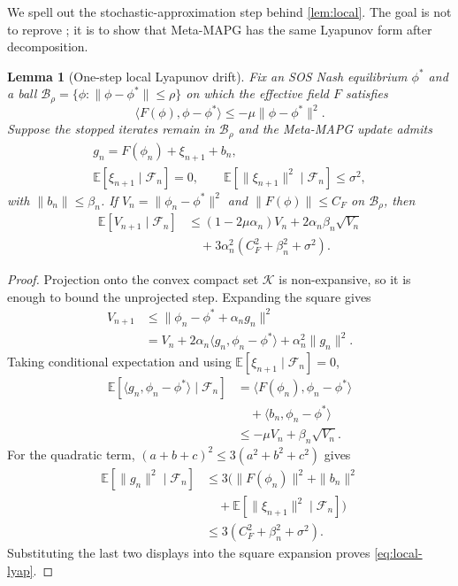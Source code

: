 \documentclass{article}
\theoremstyle{plain}
\newtheorem{lemma}[theorem]{Lemma}
\theoremstyle{definition}
\theoremstyle{remark}
\newcommand{\E}{\mathbb{E}}
\newcommand{\K}{\mathcal{K}}
\newcommand{\B}{\mathcal{B}}
\newcommand{\F}{\mathcal{F}}
\begin{document}
We spell out the stochastic-approximation step behind \cref{lem:local}. The goal is not to reprove \citet{giannou2022convergence}; it is to show that Meta-MAPG has the same Lyapunov form after decomposition.

\begin{lemma}[One-step local Lyapunov drift]\label{lem:app-lyapunov}
Fix an SOS Nash equilibrium $\phi^\ast$ and a ball $\B_\rho=\{\phi:\|\phi-\phi^\ast\|\le\rho\}$ on which the effective field $F$ satisfies
\[
\langle F(\phi),\phi-\phi^\ast\rangle\le -\mu\|\phi-\phi^\ast\|^2 .
\]
Suppose the stopped iterates remain in $\B_\rho$ and the Meta-MAPG update admits
\[
\begin{gathered}
g_n=F(\phi_n)+\xi_{n+1}+b_n,\\
\E[\xi_{n+1}\mid\F_n]=0,\qquad
\E[\|\xi_{n+1}\|^2\mid\F_n]\le\sigma^2,
\end{gathered}
\]
with $\|b_n\|\le\beta_n$. If $V_n=\|\phi_n-\phi^\ast\|^2$ and $\|F(\phi)\|\le C_F$ on $\B_\rho$, then
\begin{equation}\label{eq:local-lyap}
\begin{aligned}
\E[V_{n+1}\mid\F_n]
&\le (1-2\mu\alpha_n)V_n
   +2\alpha_n\beta_n\sqrt{V_n}\\
&\quad+3\alpha_n^2(C_F^2+\beta_n^2+\sigma^2).
\end{aligned}
\end{equation}
\end{lemma}

\begin{proof}
Projection onto the convex compact set $\K$ is non-expansive, so it is enough to bound the unprojected step. Expanding the square gives
\[
\begin{aligned}
V_{n+1}
&\le \|\phi_n-\phi^\ast+\alpha_n g_n\|^2\\
&=V_n+2\alpha_n\langle g_n,\phi_n-\phi^\ast\rangle
  +\alpha_n^2\|g_n\|^2 .
\end{aligned}
\]
Taking conditional expectation and using $\E[\xi_{n+1}\mid\F_n]=0$,
\[
\begin{aligned}
\E[\langle g_n,\phi_n-\phi^\ast\rangle\mid\F_n]
&=\langle F(\phi_n),\phi_n-\phi^\ast\rangle\\
&\quad+\langle b_n,\phi_n-\phi^\ast\rangle\\
&\le -\mu V_n+\beta_n\sqrt{V_n}.
\end{aligned}
\]
For the quadratic term, $(a+b+c)^2\le 3(a^2+b^2+c^2)$ gives
\[
\begin{aligned}
\E[\|g_n\|^2\mid\F_n]
&\le 3\bigl(\|F(\phi_n)\|^2+\|b_n\|^2\\
&\quad+\E[\|\xi_{n+1}\|^2\mid\F_n]\bigr)\\
&\le 3(C_F^2+\beta_n^2+\sigma^2).
\end{aligned}
\]
Substituting the last two displays into the square expansion proves \eqref{eq:local-lyap}.
\end{proof}
\end{document}
